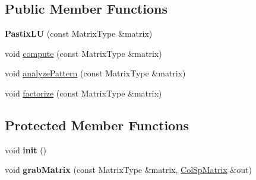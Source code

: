 \subsection*{Public Member Functions}
\begin{DoxyCompactItemize}
\item 
\mbox{\label{class_eigen_1_1_pastix_l_u_a7d080a8a45f2fd33ba174333c60f87b8}} 
{\bfseries Pastix\+LU} (const Matrix\+Type \&matrix)
\item 
void \mbox{\hyperlink{class_eigen_1_1_pastix_l_u_adc28ee2550086c7bdfe991d624bde2ee}{compute}} (const Matrix\+Type \&matrix)
\item 
void \mbox{\hyperlink{class_eigen_1_1_pastix_l_u_abae3ca7f1254106d9e2d5e0f273189fa}{analyze\+Pattern}} (const Matrix\+Type \&matrix)
\item 
void \mbox{\hyperlink{class_eigen_1_1_pastix_l_u_ac178a87b499a2210a402787fbfd98f26}{factorize}} (const Matrix\+Type \&matrix)
\end{DoxyCompactItemize}
\subsection*{Protected Member Functions}
\begin{DoxyCompactItemize}
\item 
\mbox{\label{class_eigen_1_1_pastix_l_u_afe75c3d2574bc61dfac397b8b420c376}} 
void {\bfseries init} ()
\item 
\mbox{\label{class_eigen_1_1_pastix_l_u_a2c8ec7fef67f389d3adde38f50dab05a}} 
void {\bfseries grab\+Matrix} (const Matrix\+Type \&matrix, \mbox{\hyperlink{class_eigen_1_1_sparse_matrix}{Col\+Sp\+Matrix}} \&out)
\end{DoxyCompactItemize}
